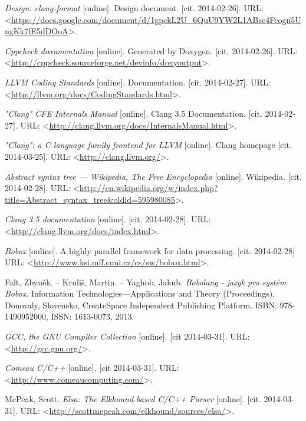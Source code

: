 \begin{thebibliography}{99}
	\emph{Design: clang-format} [online].
	Design document.
	[cit. 2014-02-26].
	URL: <\url{https://docs.google.com/document/d/1gpckL2U_6QuU9YW2L1ABsc4Fcogn5UngKk7fE5dDOoA}>.
	
	\emph{Cppcheck doxumentation} [online].
	Generated by Doxygen.
	[cit. 2014-02-26].
	URL: <\url{http://cppcheck.sourceforge.net/devinfo/doxyoutput}>.
	
	\emph{LLVM Coding Standards} [online].
	Documentation.
	[cit. 2014-02-27].
	URL: <\url{http://llvm.org/docs/CodingStandards.html}>.
	
	\emph{"Clang" CFE Internals Manual} [online].
	Clang 3.5 Documentation.
	[cit. 2014-02-27].
	URL: <\url{http://clang.llvm.org/docs/InternalsManual.html}>.
	
	\emph{"Clang": a C language family frontend for LLVM} [online].
	Clang homepage
	[cit. 2014-03-25].
	URL: <\url{http://clang.llvm.org/}>.
	
	\emph{Abstract syntax tree --- {W}ikipedia{,} The Free Encyclopedia} [online].
	Wikipedia.
	[cit. 2014-02-28].
	URL: <\url{http://en.wikipedia.org/w/index.php?title=Abstract_syntax_tree&oldid=595980085}>.
	
	\emph{Clang 3.5 documentation} [online].
	[cit. 2014-02-28].
	URL: <\url{http://clang.llvm.org/docs/index.html}>.

	\emph{Bobox} [online].
	A highly parallel framework for data processing.
	[cit. 2014-02-28]
	URL: <\url{http://www.ksi.mff.cuni.cz/cs/sw/bobox.html}>.

	{\sc Falt}, Zbyněk. -- {\sc Kruliš}, Martin. -- {\sc Yaghob}, Jakub.
	\emph{Bobolang - jazyk pro systém Bobox}.
	Information Technologies—Applications and Theory (Proceedings), Donovaly, Slovensko, CreateSpace Independent Publishing Platform.
	ISBN: 978-1490952000, ISSN: 1613-0073, 2013.
  
	\emph{GCC, the GNU Compiler Collection} [online].
	[cit 2014-03-31].
	URL: <\url{http://gcc.gnu.org/}>.

	\emph{Comeau C/C++} [online].
	[cit 2014-03-31].
	URL: <\url{http://www.comeaucomputing.com/}>.

	{\sc McPeak}, Scott.
	\emph{Elsa: The Elkhound-based C/C++ Parser} [online].
	[cit. 2014-03-31].
	URL: <\url{http://scottmcpeak.com/elkhound/sources/elsa/}>.
	

\end{thebibliography}
